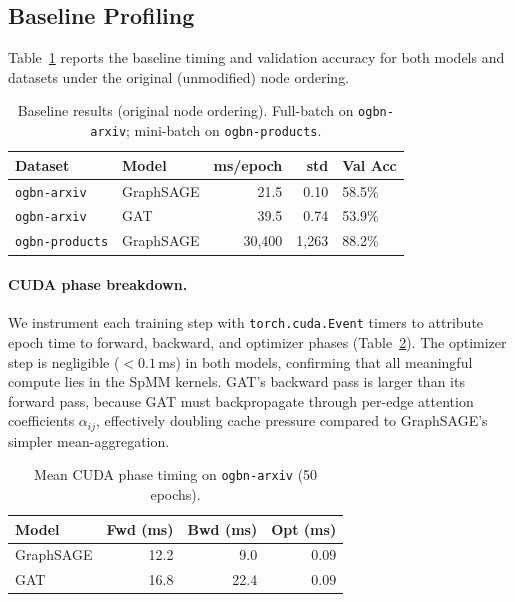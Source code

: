 \documentclass[sigconf,review]{acmart}
\begin{document}
\subsection{Baseline Profiling}

Table~\ref{tab:baseline} reports the baseline timing and validation accuracy for both models and datasets under the original (unmodified) node ordering.

\begin{table}[h]
\centering
\caption{Baseline results (original node ordering). Full-batch on \texttt{ogbn-arxiv}; mini-batch on \texttt{ogbn-products}.}
\label{tab:baseline}
\begin{tabular}{llrrl}
\toprule
\textbf{Dataset} & \textbf{Model} & \textbf{ms/epoch} & \textbf{std} & \textbf{Val Acc} \\
\midrule
\texttt{ogbn-arxiv}    & GraphSAGE & 21.5     & 0.10 & 58.5\% \\
\texttt{ogbn-arxiv}    & GAT       & 39.5     & 0.74 & 53.9\% \\
\texttt{ogbn-products} & GraphSAGE & 30{,}400 & 1{,}263 & 88.2\% \\
\bottomrule
\end{tabular}
\end{table}

\paragraph{CUDA phase breakdown.}
We instrument each training step with \texttt{torch.cuda.Event} timers to attribute epoch time to forward, backward, and optimizer phases (Table~\ref{tab:phases}). The optimizer step is negligible ($<\!0.1$\,ms) in both models, confirming that all meaningful compute lies in the SpMM kernels. GAT's backward pass is larger than its forward pass, because GAT must backpropagate through per-edge attention coefficients $\alpha_{ij}$, effectively doubling cache pressure compared to GraphSAGE's simpler mean-aggregation.

\begin{table}[h]
\centering
\caption{Mean CUDA phase timing on \texttt{ogbn-arxiv} (50 epochs).}
\label{tab:phases}
\begin{tabular}{lrrr}
\toprule
\textbf{Model} & \textbf{Fwd (ms)} & \textbf{Bwd (ms)} & \textbf{Opt (ms)} \\
\midrule
GraphSAGE & 12.2 & \phantom{0}9.0 & 0.09 \\
GAT       & 16.8 & 22.4 & 0.09 \\
\bottomrule
\end{tabular}
\end{table}
\end{document}
